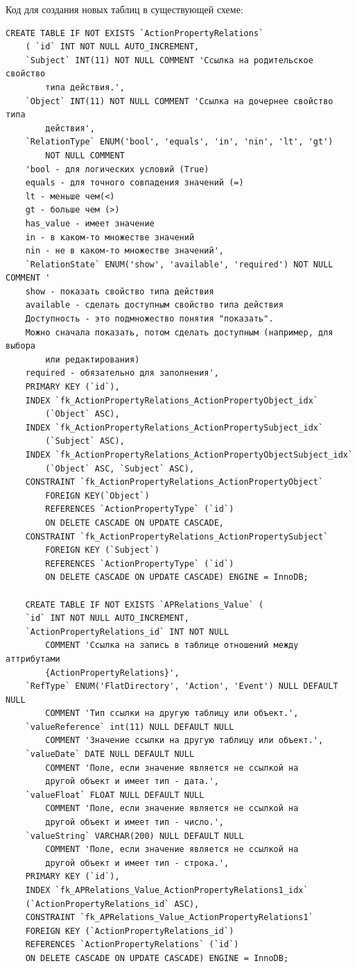 \documentclass[a4paper,8pt]{report} %
\begin{document}
{    Код для создания новых таблиц в существующей схеме:
\begin{verbatim}
CREATE TABLE IF NOT EXISTS `ActionPropertyRelations`
    ( `id` INT NOT NULL AUTO_INCREMENT,
    `Subject` INT(11) NOT NULL COMMENT 'Ссылка на родительское свойство
        типа действия.',
    `Object` INT(11) NOT NULL COMMENT 'Ссылка на дочернее свойство типа
        действия',
    `RelationType` ENUM('bool', 'equals', 'in', 'nin', 'lt', 'gt')
        NOT NULL COMMENT
    'bool - для логических условий (True)
    equals - для точного совпадения значений (=)
    lt - меньше чем(<)
    gt - больше чем (>)
    has_value - имеет значение
    in - в каком-то множестве значений
    nin - не в каком-то множестве значений',
    `RelationState` ENUM('show', 'available', 'required') NOT NULL COMMENT '
    show - показать свойство типа действия
    available - сделать доступным свойство типа действия
    Доступность - это подмножество понятия "показать".
    Можно сначала показать, потом сделать доступным (например, для выбора
        или редактирования)
    required - обязательно для заполнения',
    PRIMARY KEY (`id`),
    INDEX `fk_ActionPropertyRelations_ActionPropertyObject_idx`
        (`Object` ASC),
    INDEX `fk_ActionPropertyRelations_ActionPropertySubject_idx`
        (`Subject` ASC),
    INDEX `fk_ActionPropertyRelations_ActionPropertyObjectSubject_idx`
        (`Object` ASC, `Subject` ASC),
    CONSTRAINT `fk_ActionPropertyRelations_ActionPropertyObject`
        FOREIGN KEY(`Object`)
        REFERENCES `ActionPropertyType` (`id`)
        ON DELETE CASCADE ON UPDATE CASCADE,
    CONSTRAINT `fk_ActionPropertyRelations_ActionPropertySubject`
        FOREIGN KEY (`Subject`)
        REFERENCES `ActionPropertyType` (`id`)
        ON DELETE CASCADE ON UPDATE CASCADE) ENGINE = InnoDB;

    CREATE TABLE IF NOT EXISTS `APRelations_Value` (
    `id` INT NOT NULL AUTO_INCREMENT,
    `ActionPropertyRelations_id` INT NOT NULL
        COMMENT 'Ссылка на запись в таблице отношений между аттрибутами
        {ActionPropertyRelations}',
    `RefType` ENUM('FlatDirectory', 'Action', 'Event') NULL DEFAULT NULL
        COMMENT 'Тип ссылки на другую таблицу или объект.',
    `valueReference` int(11) NULL DEFAULT NULL
        COMMENT 'Значение ссылки на другую таблицу или объект.',
    `valueDate` DATE NULL DEFAULT NULL
        COMMENT 'Поле, если значение является не ссылкой на
        другой объект и имеет тип - дата.',
    `valueFloat` FLOAT NULL DEFAULT NULL
        COMMENT 'Поле, если значение является не ссылкой на
        другой объект и имеет тип - число.',
    `valueString` VARCHAR(200) NULL DEFAULT NULL
        COMMENT 'Поле, если значение является не ссылкой на
        другой объект и имеет тип - строка.',
    PRIMARY KEY (`id`),
    INDEX `fk_APRelations_Value_ActionPropertyRelations1_idx`
    (`ActionPropertyRelations_id` ASC),
    CONSTRAINT `fk_APRelations_Value_ActionPropertyRelations1`
    FOREIGN KEY (`ActionPropertyRelations_id`)
    REFERENCES `ActionPropertyRelations` (`id`)
    ON DELETE CASCADE ON UPDATE CASCADE) ENGINE = InnoDB;
\end{verbatim}

}
\end{document}
